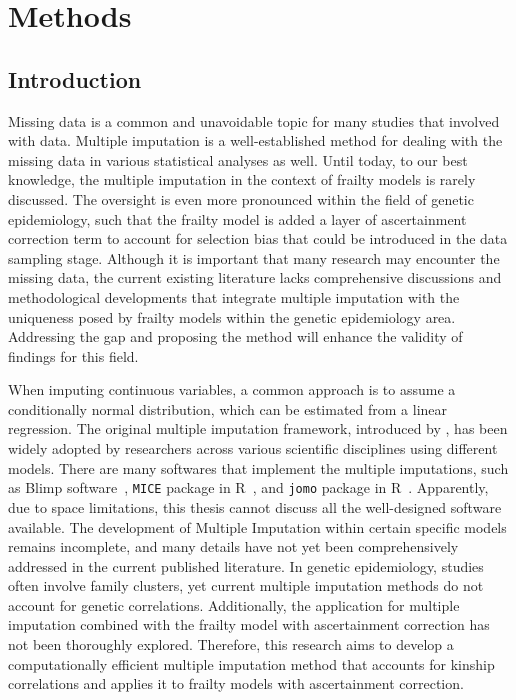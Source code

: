 \chapter{Methods}
\section{Introduction}
Missing data is a common and unavoidable topic for many studies that involved with data. 
Multiple imputation is a well-established method for dealing with the missing data in various statistical analyses as well. 
Until today, to our best knowledge, the multiple imputation in the context of frailty models is rarely discussed. 
The oversight is even more pronounced within the field of genetic epidemiology, such that the frailty model is added a layer of ascertainment correction term to account for selection bias that could be introduced in the data sampling stage.
Although it is important that many research may encounter the missing data, the current existing literature lacks comprehensive discussions and methodological developments that integrate multiple imputation with the uniqueness posed by frailty models within the genetic epidemiology area. 
Addressing the gap and proposing the method will enhance the validity of findings for this field. 

When imputing continuous variables, a common approach is to assume a conditionally normal distribution, which can be estimated from a linear regression.
The original multiple imputation framework, introduced by \citet{rubin1987multiple}, has been widely adopted by researchers across various scientific disciplines using different models.
There are many softwares that implement the multiple imputations, such as Blimp software~\cite{keller2021blimp}, \texttt{MICE} package in R~\cite{royston2011multiple}, and \texttt{jomo} package in R~\cite{quartagno2019jomo}. 
Apparently, due to space limitations, this thesis cannot discuss all the well-designed software available.
The development of Multiple Imputation within certain specific models remains incomplete, and many details have not yet been comprehensively addressed in the current published literature.
In genetic epidemiology, studies often involve family clusters, yet current multiple imputation methods do not account for genetic correlations.
Additionally, the application for multiple imputation combined with the frailty model with ascertainment correction has not been thoroughly explored.
Therefore, this research aims to develop a computationally efficient multiple imputation method that accounts for kinship correlations and applies it to frailty models with ascertainment correction.

